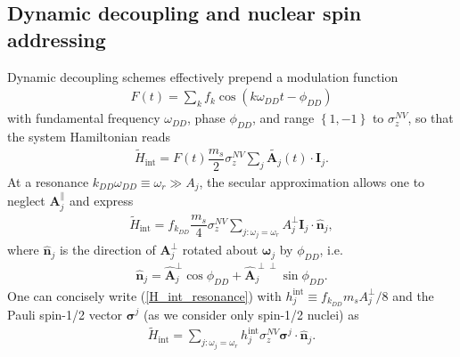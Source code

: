 \documentclass[twocolumn]{revtex4}
\renewcommand{\t}{\text} %
\newcommand{\f}[2]{\dfrac{#1}{#2}} %
\newcommand{\p}[1]{\left(#1\right)} %
\renewcommand{\set}[1]{\left\{#1\right\}} %
\renewcommand{\v}{\bm} %
\newcommand{\uv}[1]{\hat{\v{#1}}} %
\renewcommand{\c}{\cdot} %
\begin{document}
\subsection{Dynamic decoupling and nuclear spin addressing}

Dynamic decoupling schemes effectively prepend a modulation function
\begin{align}
  F\p{t}=\sum_kf_k\cos\p{k\omega_{DD}t-\phi_{DD}}
\end{align}
with fundamental frequency $\omega_{DD}$, phase $\phi_{DD}$, and range
$\set{1,-1}$ to $\sigma_z^{NV}$, so that the system Hamiltonian reads
\begin{align}
  \tilde H_\t{int} =
  F\p{t}\f{m_s}2\sigma_z^{NV}\sum_j\tilde{\v A_j}\p{t}\c\v I_j.
\end{align}
At a resonance $k_{DD}\omega_{DD}\equiv\omega_r\gg A_j$, the secular
approximation allows one to neglect $\v A_j^\parallel$ and express
\begin{align}
  \tilde H_\t{int} = f_{k_{DD}}\f{m_s}4\sigma_z^{NV}
  \sum_{j:\omega_j=\omega_r} A_j^\perp\v I_j\c\uv n_j,
  \label{H_int_resonance}
\end{align}
where $\uv n_j$ is the direction of $\v A_j^\perp$ rotated about
$\uv\omega_j$ by $\phi_{DD}$, i.e.
\begin{align}
  \uv n_j = \uv A_j^\perp\cos\phi_{DD} +
  \uv A_j^{\perp\perp}\sin\phi_{DD}.
\end{align}
One can concisely write (\ref{H_int_resonance}) with
$h_j^\t{int}\equiv f_{k_{DD}}m_sA_j^\perp/8$ and the Pauli spin-1/2
vector $\v\sigma^j$ (as we consider only spin-1/2 nuclei) as
\begin{align}
  \tilde H_\t{int} = \sum_{j:\omega_j=\omega_r}
  h_j^\t{int}\sigma_z^{NV}\v\sigma^j\c\uv n_j.
  \label{H_int}
\end{align}
\end{document}
